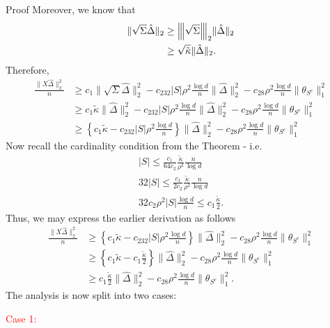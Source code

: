 \documentclass[10pt,handout,english]{beamer}
\newcommand{\vertiii}[1]{{\left\vert\kern-0.25ex\left\vert\kern-0.25ex\left\vert #1 
    \right\vert\kern-0.25ex\right\vert\kern-0.25ex\right\vert}}
\begin{document}
\begin{frame}[allowframebreaks]{Proof}
Moreover, we know that 
\begingroup
\allowdisplaybreaks
\begin{align*}
\lVert\sqrt{\Sigma}\hat{\Delta}\rVert_2&\geq \vertiii{\sqrt{\Sigma}}_2\lVert\hat{\Delta}\rVert_2\\
&\geq\sqrt{\tilde{\kappa}}\lVert\hat{\Delta}\rVert_2.
\end{align*}
\endgroup
Therefore,
\begin{align*}
\frac{\lVert X\hat{\Delta}\rVert_2^2}{n}&\geq c_1\lVert\sqrt{\Sigma}\hat{\Delta}\rVert_2^2-c_232\lvert S\rvert\rho^2\frac{\log d}{n}\lVert\hat{\Delta}\rVert_2^2-c_28\rho^2\frac{\log d}{n}\lVert\theta_{S^c}\rVert_1^2\\
&\geq c_1\tilde{\kappa}\lVert\hat{\Delta}\rVert_2^2-c_232\lvert S\rvert\rho^2\frac{\log d}{n}\lVert\hat{\Delta}\rVert_2^2-c_28\rho^2\frac{\log d}{n}\lVert\theta_{S^c}\rVert_1^2\\
&\geq  \left\{c_1\tilde{\kappa}-c_232\lvert S\rvert\rho^2\frac{\log d}{n}\right\}\lVert\hat{\Delta}\rVert_2^2-c_28\rho^2\frac{\log d}{n}\lVert\theta_{S^c}\rVert_1^2
\end{align*}
Now recall the cardinality condition from the Theorem - i.e.
\begin{align*}
\lvert S\rvert\leq \frac{c_1}{64c_2}\frac{\tilde{\kappa}}{\rho^2}\frac{n}{\log d}\\
32\lvert S\rvert\leq \frac{c_1}{2c_2}\frac{\tilde{\kappa}}{\rho^2}\frac{n}{\log d}\\
32 c_2\rho^2\lvert S\rvert\frac{\log d}{n}\leq c_1\frac{\tilde{\kappa}}{2}.
\end{align*}
Thus, we may express the earlier derivation as follows
\begin{align*}
\frac{\lVert X\hat{\Delta}\rVert_2^2}{n}&\geq \left\{c_1\tilde{\kappa}-c_232\lvert S\rvert\rho^2\frac{\log d}{n}\right\}\lVert\hat{\Delta}\rVert_2^2-c_28\rho^2\frac{\log d}{n}\lVert\theta_{S^c}\rVert_1^2\\
&\geq \left\{c_1\tilde{\kappa}-c_1\frac{\tilde{\kappa}}{2}\right\}\lVert\hat{\Delta}\rVert_2^2-c_28\rho^2\frac{\log d}{n}\lVert\theta_{S^c}\rVert_1^2\\
&\geq c_1\frac{\tilde{\kappa}}{2}\lVert\hat{\Delta}\rVert_2^2-c_28\rho^2\frac{\log d}{n}\lVert\theta_{S^c}\rVert_1^2.
\end{align*}
The analysis is now split into two cases:

\noindent\textcolor{red}{Case 1:}


\end{frame}
\end{document}
